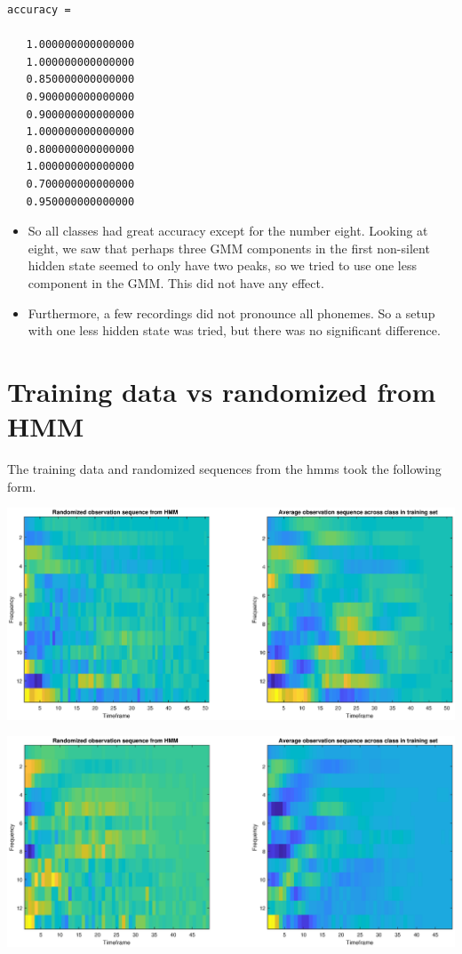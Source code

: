 \documentclass[]{article}
\let\origfigure\figure
\let\endorigfigure\endfigure
\renewenvironment{figure}[1][2] {
    \expandafter\origfigure\expandafter[H]
} {
    \endorigfigure
}
\begin{document}
\begin{verbatim}
accuracy =

   1.000000000000000
   1.000000000000000
   0.850000000000000
   0.900000000000000
   0.900000000000000
   1.000000000000000
   0.800000000000000
   1.000000000000000
   0.700000000000000
   0.950000000000000
\end{verbatim}

\begin{itemize}
\item
  So all classes had great accuracy except for the number eight. Looking
  at eight, we saw that perhaps three GMM components in the first
  non-silent hidden state seemed to only have two peaks, so we tried to
  use one less component in the GMM. This did not have any effect.
\item
  Furthermore, a few recordings did not pronounce all phonemes. So a
  setup with one less hidden state was tried, but there was no
  significant difference.
\end{itemize}

\newpage

\hypertarget{training-data-vs-randomized-from-hmm}{%
\section{Training data vs randomized from
HMM}\label{training-data-vs-randomized-from-hmm}}

The training data and randomized sequences from the hmms took the
following form.

\begin{figure}
\centering
\includegraphics{../Results/randCompClass0.eps}
\caption{Randomized vs training data class zero}
\end{figure}

\begin{figure}
\centering
\includegraphics{../Results/randCompClass1.eps}
\caption{Randomized vs training data class one}
\end{figure}
\end{document}
